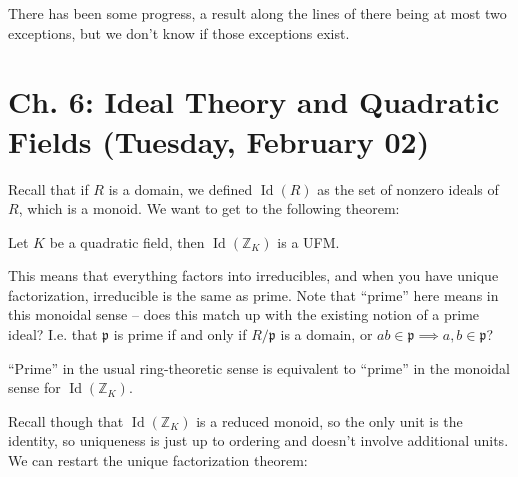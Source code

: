 \begin{remark}

There has been some progress, a result along the lines of there being at
most two exceptions, but we don't know if those exceptions exist.

\end{remark}

\hypertarget{ch.-6-ideal-theory-and-quadratic-fields-tuesday-february-02}{%
\section{Ch. 6: Ideal Theory and Quadratic Fields (Tuesday, February
02)}\label{ch.-6-ideal-theory-and-quadratic-fields-tuesday-february-02}}

Recall that if \(R\) is a domain, we defined \(\operatorname{Id}(R)\) as
the set of nonzero ideals of \(R\), which is a monoid. We want to get to
the following theorem:

\begin{theorem}

Let \(K\) be a quadratic field, then
\(\operatorname{Id}({\mathbb{Z}}_K)\) is a UFM.

\end{theorem}

\begin{remark}

This means that everything factors into irreducibles, and when you have
unique factorization, irreducible is the same as prime. Note that
``prime'' here means in this monoidal sense -- does this match up with
the existing notion of a prime ideal? I.e. that \(\mathfrak{p}\) is
prime if and only if \(R/ \mathfrak{p}\) is a domain, or
\(ab\in \mathfrak{p}\implies a,b \in \mathfrak{p}\)?

\end{remark}

\begin{proposition}[?]

``Prime'' in the usual ring-theoretic sense is equivalent to ``prime''
in the monoidal sense for \(\operatorname{Id}({\mathbb{Z}}_K)\).

\end{proposition}

\begin{remark}

Recall though that \(\operatorname{Id}({\mathbb{Z}}_K)\) is a reduced
monoid, so the only unit is the identity, so uniqueness is just up to
ordering and doesn't involve additional units. We can restart the unique
factorization theorem:

\end{remark}

